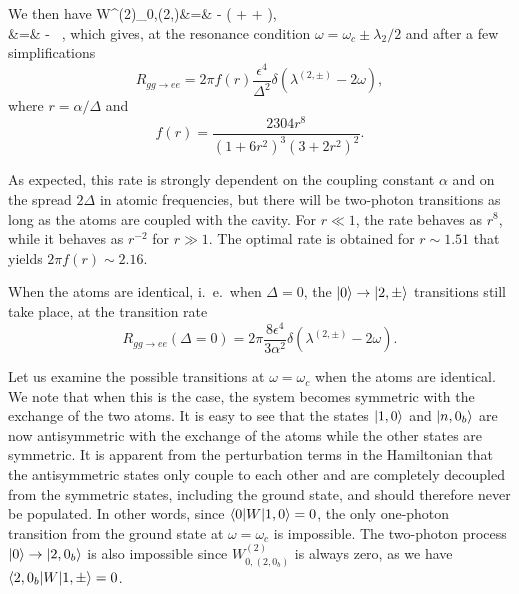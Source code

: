 We then have
\bea
W^{(2)}_{0,(2,\pm)}&=& - \left( +  +  \right), \\
&=& - \, ,
\eea
which gives, at the resonance condition $\omega = \omega_c \pm \lambda_2/2$ and after a few simplifications
\begin{equation}
\label{Pggee2}
R_{gg \rightarrow ee} = 2 \pi f(r) \frac{\epsilon^4}{\Delta^2} \delta(\lambda^{(2,\pm)} - 2\omega),
\end{equation}
where $r = \alpha/\Delta$ and
\begin{equation}
f(r) = \frac{2304 r^8}{(1 + 6 r^2)^3 (3 + 2 r^2)^2}.
\end{equation}

As expected, this rate is strongly dependent on the coupling constant $\alpha$ and on the spread $2 \Delta$ in atomic frequencies, but there will be two-photon transitions as long as the atoms are coupled with the cavity. For $r \ll 1$, the rate behaves as $r^8$, while it behaves as $r^{-2}$ for $r \gg 1$. The optimal rate is obtained for $r \sim 1.51$ that yields $2 \pi f(r) \sim 2.16$.

When the atoms are identical, i.~e.~when $\Delta=0$, the $| 0 \rangle \rightarrow | 2,\pm \rangle$ transitions still take place, at the transition rate
\[R_{gg \rightarrow ee} (\Delta=0)= 2 \pi \frac{8 \epsilon^4}{3 \alpha^2} \delta(\lambda^{(2,\pm)} - 2\omega). \]

Let us examine the possible transitions at $\omega=\omega_c$ when the atoms are identical. We note that when this is the case, the system becomes symmetric with the exchange of the two atoms. It is easy to see that the states $| 1,0 \rangle$ and $| n,0_b \rangle$ are now antisymmetric with the exchange of the atoms while the other states are symmetric. It is apparent from the perturbation terms in the Hamiltonian that the antisymmetric states only couple to each other and are completely decoupled from the symmetric states, including the ground state, and should therefore never be populated. In other words, since $\langle 0 | W | 1,0 \rangle=0$, the only one-photon transition from the ground state at $\omega=\omega_c$ is impossible. The two-photon process $| 0 \rangle \rightarrow | 2,0_b \rangle$ is also impossible since $W^{(2)}_{0,(2,0_{b})}$ is always zero, as we have $\langle 2,0_b | W | 1,\pm \rangle=0$. 

